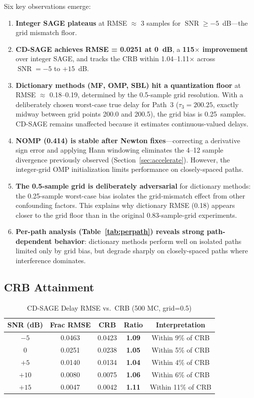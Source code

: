 \documentclass[a4paper,fleqn]{cas-dc}
\DeclareMathOperator{\SNR}{SNR}
\begin{document}
Six key observations emerge:

\begin{enumerate}
\item \textbf{Integer SAGE plateaus} at RMSE $\approx$ 3 samples for $\SNR \ge -5$~dB---the grid mismatch floor.
\item \textbf{CD-SAGE achieves RMSE = 0.0251 at 0~dB}, a \textbf{115$\times$ improvement} over integer SAGE, and tracks the CRB within 1.04--1.11$\times$ across $\SNR = -5$ to $+15$~dB.
\item \textbf{Dictionary methods (MF, OMP, SBL) hit a quantization floor} at RMSE $\approx$ 0.18--0.19, determined by the 0.5-sample grid resolution. With a deliberately chosen worst-case true delay for Path~3 ($\tau_3 = 200.25$, exactly midway between grid points 200.0 and 200.5), the grid bias is 0.25~samples. CD-SAGE remains unaffected because it estimates continuous-valued delays.
\item \textbf{NOMP (0.414) is stable after Newton fixes}---correcting a derivative sign error and applying Hann windowing eliminates the 4--12 sample divergence previously observed (Section~\ref{sec:accelerate}). However, the integer-grid OMP initialization limits performance on closely-spaced paths.
\item \textbf{The 0.5-sample grid is deliberately adversarial} for dictionary methods: the 0.25-sample worst-case bias isolates the grid-mismatch effect from other confounding factors. This explains why dictionary RMSE (0.18) appears closer to the grid floor than in the original 0.83-sample-grid experiments.
\item \textbf{Per-path analysis (Table~\ref{tab:perpath}) reveals strong path-dependent behavior}: dictionary methods perform well on isolated paths limited only by grid bias, but degrade sharply on closely-spaced paths where interference dominates.
\end{enumerate}

\subsection{CRB Attainment}

\begin{table}[width=.9\linewidth,cols=5,pos=h]
\centering
\caption{CD-SAGE Delay RMSE vs.\ CRB (500 MC, grid=0.5)}
\label{tab:crb}
\small
\begin{tabular}{@{}ccccc@{}}
\toprule
SNR (dB) & Frac RMSE & CRB & Ratio & Interpretation \\
\midrule
$-5$ & 0.0463 & 0.0423 & \textbf{1.09} & Within 9\% of CRB \\
$0$  & 0.0251 & 0.0238 & \textbf{1.05} & Within 5\% of CRB \\
$+5$ & 0.0140 & 0.0134 & \textbf{1.04} & Within 4\% of CRB \\
$+10$& 0.0080 & 0.0075 & \textbf{1.06} & Within 6\% of CRB \\
$+15$& 0.0047 & 0.0042 & \textbf{1.11} & Within 11\% of CRB \\
\bottomrule
\end{tabular}
\end{table}
\end{document}

